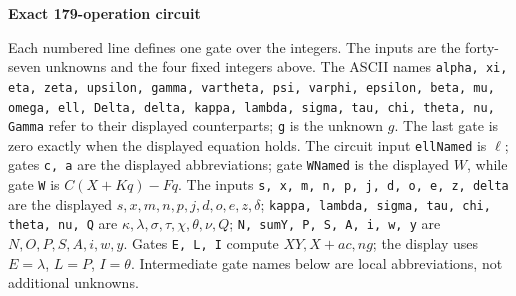 \documentclass[10pt]{article}
\begin{document}
\clearpage
\begin{center}{\large\bfseries Exact 179-operation circuit}\end{center}
Each numbered line defines one gate over the integers. The inputs are the
forty-seven unknowns and the four fixed integers above. The ASCII names
\texttt{alpha, xi, eta, zeta, upsilon, gamma, vartheta, psi, varphi, epsilon, beta, mu, omega, ell, Delta, delta, kappa, lambda, sigma, tau, chi, theta, nu, Gamma}
refer to their displayed counterparts; \texttt{g} is the unknown $g$. The last
gate is zero exactly when the displayed equation holds. The circuit input
\texttt{ellNamed} is $\ell$; gates \texttt{c, a} are the displayed abbreviations; gate \texttt{WNamed} is the
displayed $W$, while gate \texttt{W} is $C(X+Kq)-Fq$. The inputs
\texttt{s, x, m, n, p, j, d, o, e, z, delta} are the displayed
$s,x,m,n,p,j,d,o,e,z,\delta$; \texttt{kappa, lambda, sigma, tau, chi, theta, nu, Q}
are $\kappa,\lambda,\sigma,\tau,\chi,\theta,\nu,Q$; \texttt{N, sumY, P, S, A, i, w, y}
are $N,O,P,S,A,i,w,y$. Gates \texttt{E, L, I} compute $XY,X+ac,ng$;
the display uses $E=\lambda$, $L=P$, $I=\theta$. Intermediate gate
names below are local abbreviations, not additional unknowns.
\end{document}
